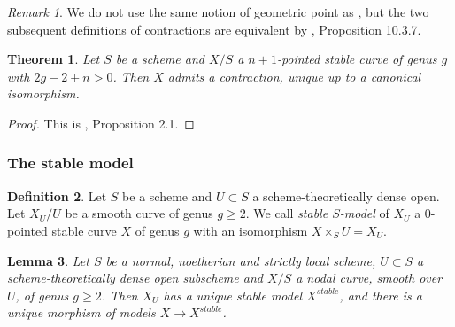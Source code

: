 \documentclass[a4paper,10pt,twoside]{article}
\newcommand{\ra}{\rightarrow}
\newtheorem{thm}{Theorem}[section]
\newtheorem{lem}[thm]{Lemma}
\theoremstyle{definition}
\newtheorem{defi}[thm]{Definition}
\theoremstyle{remark}
\newtheorem{rem}{Remark}[thm]
\begin{document}
\begin{rem}
We do not use the same notion of geometric point as \cite{Knudsen}, but the two subsequent definitions of contractions are equivalent by \cite{Liu}, Proposition 10.3.7.
\end{rem}

\begin{thm}\label{Theorem existence of contractions}
Let $S$ be a scheme and $X/S$ a $n+1$-pointed stable curve of genus $g$ with $2g-2+n>0$. Then $X$ admits a contraction, unique up to a canonical isomorphism.
\end{thm}

\begin{proof}
This is \cite{Knudsen}, Proposition 2.1.
\end{proof}

\subsubsection{The stable model}

\begin{defi}\label{definition stable model}
Let $S$ be a scheme and $U\subset S$ a scheme-theoretically dense open. Let $X_U/U$ be a smooth curve of genus $g\geq 2$. We call \emph{stable $S$-model} of $X_U$ a $0$-pointed stable curve $X$ of genus $g$ with an isomorphism $X\times_S U=X_U$.
\end{defi}


\begin{lem}\label{existence des modeles stables localement sur S}
Let $S$ be a normal, noetherian and strictly local scheme, $U\subset S$ a scheme-theoretically dense open subscheme and $X/S$ a nodal curve, smooth over $U$, of genus $g\geq 2$. Then $X_U$ has a unique stable model $X^{stable}$, and there is a unique morphism of models $X\ra X^{stable}$.
\end{lem}
\end{document}
